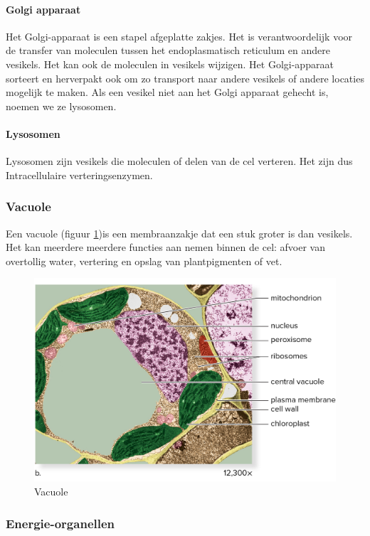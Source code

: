 \documentclass[a4paper,kul]{kulakarticle} %
\begin{document}
\paragraph{Golgi apparaat}
Het Golgi-apparaat is een stapel afgeplatte zakjes. Het is verantwoordelijk voor de transfer van moleculen tussen het endoplasmatisch reticulum en andere vesikels. Het kan ook de moleculen in vesikels wijzigen. Het Golgi-apparaat sorteert en herverpakt ook om zo transport naar andere vesikels of andere locaties mogelijk te maken. Als een vesikel niet aan het Golgi apparaat gehecht is, noemen we ze lysosomen.
\paragraph{Lysosomen}
Lysosomen zijn vesikels die moleculen of delen van de cel verteren. Het zijn dus Intracellulaire verteringsenzymen.
\subsubsection{Vacuole}
Een vacuole (figuur \ref{fig:vacuole})is een membraanzakje dat een stuk groter is dan vesikels. Het kan meerdere meerdere functies aan nemen binnen de cel: afvoer van overtollig water, vertering en opslag van plantpigmenten of vet.
\begin{figure}[!h]
	\centering
	\includegraphics[width=0.5\linewidth]{Vacuole}
	\caption[Vacuole]{Vacuole}
	\label{fig:vacuole}
\end{figure}

\subsubsection{Energie-organellen}
\end{document}
